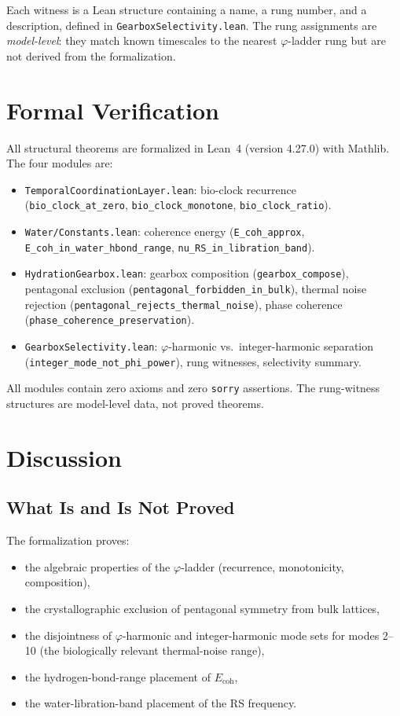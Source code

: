 \documentclass[11pt,twocolumn]{article}
\begin{document}
Each witness is a Lean structure containing a name, a rung number, and a
description, defined in \texttt{GearboxSelectivity.lean}. The rung
assignments are \emph{model-level}: they match known timescales to the
nearest $\varphi$-ladder rung but are not derived from the formalization.

\section{Formal Verification}

All structural theorems are formalized in Lean~4 (version 4.27.0) with
Mathlib. The four modules are:

\begin{itemize}
\item \texttt{TemporalCoordinationLayer.lean}: bio-clock recurrence
  (\texttt{bio\_clock\_at\_zero}, \texttt{bio\_clock\_monotone},
  \texttt{bio\_clock\_ratio}).
\item \texttt{Water/Constants.lean}: coherence energy
  (\texttt{E\_coh\_approx}, \texttt{E\_coh\_in\_water\_hbond\_range},
  \texttt{nu\_RS\_in\_libration\_band}).
\item \texttt{HydrationGearbox.lean}: gearbox composition
  (\texttt{gearbox\_compose}), pentagonal exclusion
  (\texttt{pentagonal\_forbidden\_in\_bulk}), thermal noise rejection
  (\texttt{pentagonal\_rejects\_thermal\_noise}), phase coherence
  (\texttt{phase\_coherence\_preservation}).
\item \texttt{GearboxSelectivity.lean}: $\varphi$-harmonic vs.\
  integer-harmonic separation
  (\texttt{integer\_mode\_not\_phi\_power}), rung witnesses, selectivity
  summary.
\end{itemize}

All modules contain zero axioms and zero \texttt{sorry} assertions. The
rung-witness structures are model-level data, not proved theorems.

\section{Discussion}

\subsection{What Is and Is Not Proved}

The formalization proves:
\begin{itemize}
\item the algebraic properties of the $\varphi$-ladder (recurrence,
  monotonicity, composition),
\item the crystallographic exclusion of pentagonal symmetry from bulk
  lattices,
\item the disjointness of $\varphi$-harmonic and integer-harmonic mode
  sets for modes 2--10 (the biologically relevant thermal-noise range),
\item the hydrogen-bond-range placement of $E_{\mathrm{coh}}$,
\item the water-libration-band placement of the RS frequency.
\end{itemize}
\end{document}

